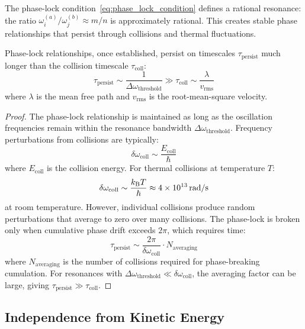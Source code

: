 The phase-lock condition~\eqref{eq:phase_lock_condition} defines a rational resonance: the ratio $\omega_i^{(a)}/\omega_j^{(b)} \approx m/n$ is approximately rational. This creates stable phase relationships that persist through collisions and thermal fluctuations.

\begin{lemma}
\label{lem:persistence}
Phase-lock relationships, once established, persist on timescales $\tau_{\text{persist}}$ much longer than the collision timescale $\tau_{\text{coll}}$:
\begin{equation}
\tau_{\text{persist}} \sim \frac{1}{\Delta\omega_{\text{threshold}}} \gg \tau_{\text{coll}} \sim \frac{\lambda}{v_{\text{rms}}}
\label{eq:persistence}
\end{equation}
where $\lambda$ is the mean free path and $v_{\text{rms}}$ is the root-mean-square velocity.
\end{lemma}

\begin{proof}
The phase-lock relationship is maintained as long as the oscillation frequencies remain within the resonance bandwidth $\Delta\omega_{\text{threshold}}$. Frequency perturbations from collisions are typically:
\begin{equation}
\delta\omega_{\text{coll}} \sim \frac{E_{\text{coll}}}{\hbar}
\end{equation}
where $E_{\text{coll}}$ is the collision energy. For thermal collisions at temperature $T$:
\begin{equation}
\delta\omega_{\text{coll}} \sim \frac{k_{\mathrm{B}} T}{\hbar} \approx 4 \times 10^{13} \, \text{rad/s}
\end{equation}
at room temperature. However, individual collisions produce random perturbations that average to zero over many collisions. The phase-lock is broken only when cumulative phase drift exceeds $2\pi$, which requires time:
\begin{equation}
\tau_{\text{persist}} \sim \frac{2\pi}{\delta\omega_{\text{coll}}} \cdot N_{\text{averaging}}
\end{equation}
where $N_{\text{averaging}}$ is the number of collisions required for phase-breaking cumulation. For resonances with $\Delta\omega_{\text{threshold}} \ll \delta\omega_{\text{coll}}$, the averaging factor can be large, giving $\tau_{\text{persist}} \gg \tau_{\text{coll}}$.
\end{proof}

\subsection{Independence from Kinetic Energy}

